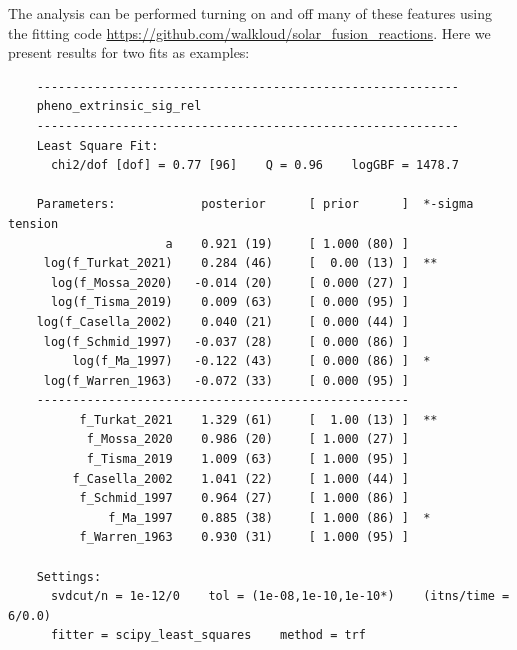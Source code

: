 \documentclass[prd,10pt,superscriptaddress,notitlepage,tightenlines,nofootinbib,floatfix]{revtex4-1}
\begin{document}
The analysis can be performed turning on and off many of these features using the fitting code \url{https://github.com/walkloud/solar_fusion_reactions}.
Here we present results for two fits as examples:
\begin{verbatim}
    -----------------------------------------------------------
    pheno_extrinsic_sig_rel
    -----------------------------------------------------------
    Least Square Fit:
      chi2/dof [dof] = 0.77 [96]    Q = 0.96    logGBF = 1478.7
    
    Parameters:            posterior      [ prior      ]  *-sigma tension
                      a    0.921 (19)     [ 1.000 (80) ]
     log(f_Turkat_2021)    0.284 (46)     [  0.00 (13) ]  **
      log(f_Mossa_2020)   -0.014 (20)     [ 0.000 (27) ]
      log(f_Tisma_2019)    0.009 (63)     [ 0.000 (95) ]
    log(f_Casella_2002)    0.040 (21)     [ 0.000 (44) ]
     log(f_Schmid_1997)   -0.037 (28)     [ 0.000 (86) ]
         log(f_Ma_1997)   -0.122 (43)     [ 0.000 (86) ]  *
     log(f_Warren_1963)   -0.072 (33)     [ 0.000 (95) ]
    ----------------------------------------------------
          f_Turkat_2021    1.329 (61)     [  1.00 (13) ]  **
           f_Mossa_2020    0.986 (20)     [ 1.000 (27) ]
           f_Tisma_2019    1.009 (63)     [ 1.000 (95) ]
         f_Casella_2002    1.041 (22)     [ 1.000 (44) ]
          f_Schmid_1997    0.964 (27)     [ 1.000 (86) ]
              f_Ma_1997    0.885 (38)     [ 1.000 (86) ]  *
          f_Warren_1963    0.930 (31)     [ 1.000 (95) ]
    
    Settings:
      svdcut/n = 1e-12/0    tol = (1e-08,1e-10,1e-10*)    (itns/time = 6/0.0)
      fitter = scipy_least_squares    method = trf
    
\end{verbatim}
\end{document}
